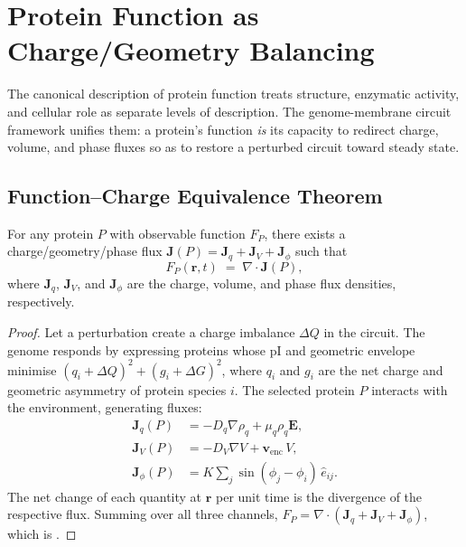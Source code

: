 \section{Protein Function as Charge/Geometry Balancing}
\label{sec:ch03-protein-function}

The canonical description of protein function treats structure, enzymatic
activity, and cellular role as separate levels of description.  The
genome-membrane circuit framework unifies them: a protein's function
\emph{is} its capacity to redirect charge, volume, and phase fluxes so as to
restore a perturbed circuit toward steady state.

\subsection{Function--Charge Equivalence Theorem}

\begin{theorem}
\label{thm:ch03-function-charge}
For any protein $P$ with observable function $F_P$, there exists a
charge/geometry/phase flux $\mathbf{J}(P)=\mathbf{J}_q+\mathbf{J}_V+\mathbf{J}_\phi$
such that
\begin{equation}
    F_P(\mathbf{r},t) \;=\; \nabla\cdot\mathbf{J}(P),
    \label{eq:ch03-function-charge}
\end{equation}
where $\mathbf{J}_q$, $\mathbf{J}_V$, and $\mathbf{J}_\phi$ are the charge,
volume, and phase flux densities, respectively.
\end{theorem}

\begin{proof}
Let a perturbation create a charge imbalance $\Delta Q$ in the circuit.  The
genome responds by expressing proteins whose pI and geometric envelope
minimise $(q_i+\Delta Q)^2+(g_i+\Delta G)^2$, where $q_i$ and $g_i$ are the
net charge and geometric asymmetry of protein species $i$.  The selected
protein $P$ interacts with the environment, generating fluxes:
\begin{align}
    \mathbf{J}_q(P) &= -D_q\nabla\rho_q + \mu_q\rho_q\mathbf{E},
    \label{eq:ch03-Jq}\\
    \mathbf{J}_V(P) &= -D_V\nabla V + \mathbf{v}_{\mathrm{enc}}\,V,
    \label{eq:ch03-JV}\\
    \mathbf{J}_\phi(P) &= K\sum_j\sin(\phi_j-\phi_i)\,\hat{e}_{ij}.
    \label{eq:ch03-Jphi}
\end{align}
The net change of each quantity at $\mathbf{r}$ per unit time is the
divergence of the respective flux.  Summing over all three channels,
$F_P=\nabla\cdot(\mathbf{J}_q+\mathbf{J}_V+\mathbf{J}_\phi)$, which is
.
\end{proof}

